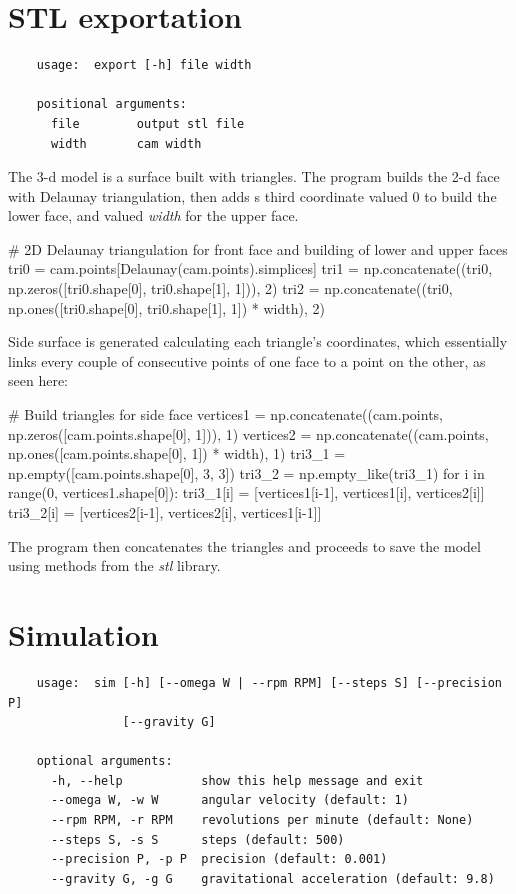 \documentclass[a4paper,10pt,twoside]{article}
\begin{document}
\section{STL exportation}\label{stl-exportation}
    \begin{verbatim}
    usage:  export [-h] file width

    positional arguments:
      file        output stl file
      width       cam width
    \end{verbatim}

    The 3-d model is a surface built with triangles. The program builds the 2-d face with Delaunay triangulation,
    then adds s third coordinate valued 0 to build the lower face, and valued \emph{width} for the upper face.
    \begin{pycode}
    # 2D Delaunay triangulation for front face and building of lower and upper faces
    tri0 = cam.points[Delaunay(cam.points).simplices]
    tri1 = np.concatenate((tri0, np.zeros([tri0.shape[0], tri0.shape[1], 1])), 2)
    tri2 = np.concatenate((tri0, np.ones([tri0.shape[0], tri0.shape[1], 1]) * width), 2)
    \end{pycode}

    Side surface is generated calculating each triangle's coordinates, which essentially links every couple of
    consecutive points of one face to a point on the other, as seen here:
    \begin{pycode}
    # Build triangles for side face
    vertices1 = np.concatenate((cam.points, np.zeros([cam.points.shape[0], 1])), 1)
    vertices2 = np.concatenate((cam.points, np.ones([cam.points.shape[0], 1]) * width), 1)
    tri3_1 = np.empty([cam.points.shape[0], 3, 3])
    tri3_2 = np.empty_like(tri3_1)
    for i in range(0, vertices1.shape[0]):
        tri3_1[i] = [vertices1[i-1], vertices1[i], vertices2[i]]
        tri3_2[i] = [vertices2[i-1], vertices2[i], vertices1[i-1]]
    \end{pycode}

    The program then concatenates the triangles and proceeds to save the model using methods from the \emph{stl} library.

\section{Simulation}\label{simulation}
    \begin{verbatim}
    usage:  sim [-h] [--omega W | --rpm RPM] [--steps S] [--precision P]
                [--gravity G]

    optional arguments:
      -h, --help           show this help message and exit
      --omega W, -w W      angular velocity (default: 1)
      --rpm RPM, -r RPM    revolutions per minute (default: None)
      --steps S, -s S      steps (default: 500)
      --precision P, -p P  precision (default: 0.001)
      --gravity G, -g G    gravitational acceleration (default: 9.8)
    \end{verbatim}
\end{document}
